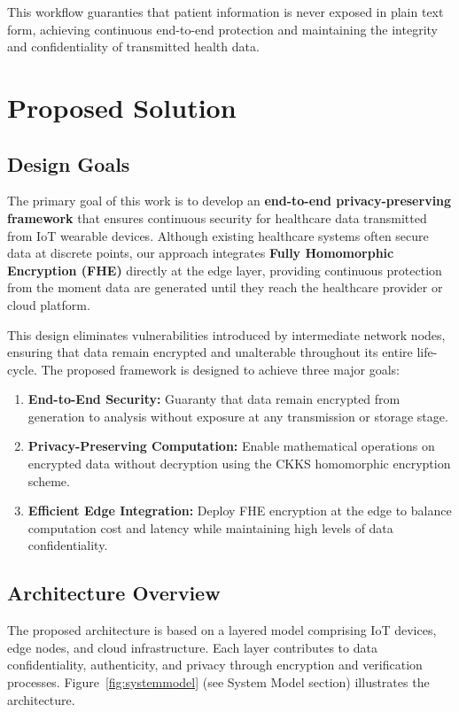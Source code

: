 \documentclass[review]{elsarticle}
\begin{document}
This workflow guaranties that patient information is never exposed in plain text form, achieving continuous end-to-end protection and maintaining the integrity and confidentiality of transmitted health data.


\section{Proposed Solution}

\subsection{Design Goals}
The primary goal of this work is to develop an \textbf{end-to-end privacy-preserving framework} that ensures continuous security for healthcare data transmitted from IoT wearable devices. Although existing healthcare systems often secure data at discrete points, our approach integrates \textbf{Fully Homomorphic Encryption (FHE)} directly at the edge layer, providing continuous protection from the moment data are generated until they reach the healthcare provider or cloud platform. 

This design eliminates vulnerabilities introduced by intermediate network nodes, ensuring that data remain encrypted and unalterable throughout its entire life-cycle. The proposed framework is designed to achieve three major goals:
\begin{enumerate}
    \item \textbf{End-to-End Security:} Guaranty that data remain encrypted from generation to analysis without exposure at any transmission or storage stage.
    \item \textbf{Privacy-Preserving Computation:} Enable mathematical operations on encrypted data without decryption using the CKKS homomorphic encryption scheme.
    \item \textbf{Efficient Edge Integration:} Deploy FHE encryption at the edge to balance computation cost and latency while maintaining high levels of data confidentiality.
\end{enumerate}

\subsection{Architecture Overview}
The proposed architecture is based on a layered model comprising IoT devices, edge nodes, and cloud infrastructure. Each layer contributes to data confidentiality, authenticity, and privacy through encryption and verification processes. Figure~\ref{fig:systemmodel} (see System Model section) illustrates the architecture.
\end{document}
